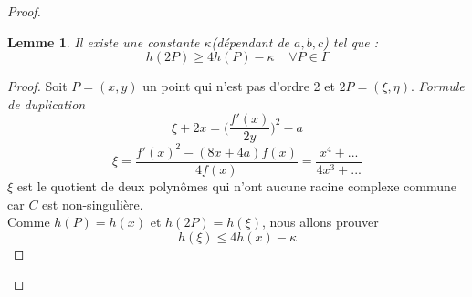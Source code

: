 \documentclass[a4paper]{article}
\newtheorem{lem}{Lemme}
\begin{document}
\begin{proof}
\begin{lem}
Il existe une constante $\kappa$(dépendant de $a,b,c$) tel que :
\begin{equation}
h(2P) \geqslant 4h(P) - \kappa \; \; \; \; \forall P \in \Gamma 
\end{equation}
\end{lem}
\begin{proof}
Soit $P=(x,y)$ un point qui n'est pas d'ordre 2 et $2P=(\xi,\eta)$.
\textit{Formule de duplication}
\begin{equation*}
\xi +2x=\Big( \frac{f'(x)}{2y}\Big)^2-a
\end{equation*}
\begin{equation*}
\xi=\frac{f'(x)^2-(8x+4a)f(x)}{4f(x)}=\frac{x^4+...}{4x^3+...}
\end{equation*}
$\xi$ est le quotient de deux polynômes qui n'ont aucune racine complexe commune car $C$ est non-singulière. \\
Comme $h(P)=h(x)$ et $h(2P)=h(\xi)$, nous allons prouver 
\begin{equation*}
h(\xi) \leqslant 4h(x)-\kappa
\end{equation*}



\end{proof}
\end{proof}
\end{document}
